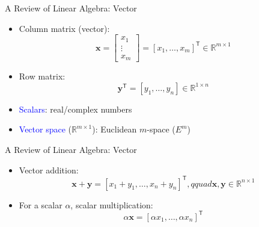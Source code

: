 \documentclass[aspectratio=169,hyperref,UTF8,CJK]{beamer}
\newcommand{\R}{\mathbb{R}}
\newcommand{\trans}{\mathsf{T}}
\newcommand{\vect}[1]{\boldsymbol{#1}}
\begin{document}
\begin{frame}{A Review of Linear Algebra: Vector}
  \begin{itemize}
    \item Column matrix (vector):
      \begin{equation*}
        \vect{x}=\begin{bmatrix}x_1\\\vdots\\x_m\end{bmatrix}
        =[x_1,\ldots,x_m]^{\trans}\in\R^{m\times1}
      \end{equation*}
    \item Row matrix:
      \begin{equation*}
        \vect{y}^{\trans}=[y_1,\ldots,y_n]\in\R^{1\times n}
      \end{equation*}
    \item \textcolor{blue}{Scalars}: real/complex numbers
    \item \textcolor{blue}{Vector space} ($\R^{m\times1}$): Euclidean $m$-space ($E^m$)
  \end{itemize}
\end{frame}

\begin{frame}{A Review of Linear Algebra: Vector}
  \begin{itemize}
    \item Vector addition:
      \begin{equation*}
        \vect{x}+\vect{y}=[x_1+y_1,\ldots,x_n+y_n]^{\trans},qquad
        \vect{x},\vect{y}\in\R^{n\times1}
      \end{equation*}
    \item For a scalar $\alpha$, scalar multiplication:
      \begin{equation*}
        \alpha\vect{x}=[\alpha x_1,\ldots,\alpha x_n]^{\trans}
      \end{equation*}
  \end{itemize}
\end{frame}
\end{document}
